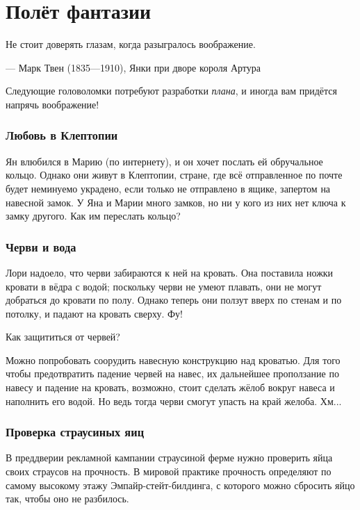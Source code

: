 \chapter{Полёт фантазии}


\setlength{\epigraphwidth}{.80\textwidth}
\epigraph{Не стоит доверять глазам, когда разыгралось воображение.
}{--- Марк Твен (1835---1910), Янки при дворе короля Артура}

Следующие головоломки потребуют разработки \emph{плана},
и иногда вам придётся напрячь воображение!

\subsection*{Любовь в Клептопии}\label{Любовь в Клептопии}

Ян влюбился в Марию (по интернету), и он хочет послать ей обручальное кольцо.
Однако они живут в Клептопии, стране, где всё отправленное по почте будет неминуемо украдено, если только не отправлено в ящике, запертом на навесной замок.
У Яна и Марии много замков, но ни у кого из них нет ключа к замку другого.
Как им переслать кольцо?

\subsection*{Черви и вода}\label{Черви и вода}

Лори надоело, что черви забираются к ней на кровать.
Она поставила ножки кровати в вёдра с водой;
поскольку черви не умеют плавать, они не могут добраться до кровати по полу.
Однако теперь они ползут вверх по стенам и по потолку, и падают на кровать сверху.
Фу!

Как защититься от червей?

Можно попробовать соорудить навесную конструкцию над кроватью.
Для того чтобы предотвратить падение червей на навес,
их дальнейшее проползание по навесу
и падение на кровать, возможно, стоит сделать жёлоб вокруг навеса и наполнить его водой.
Но ведь тогда черви смогут упасть на край желоба.
Хм...

\subsection*{Проверка страусиных яиц}

В преддверии рекламной кампании страусиной ферме нужно проверить яйца своих страусов на прочность.
В мировой практике прочность определяют по самому высокому этажу Эмпайр-стейт-билдинга, с которого можно сбросить яйцо так, чтобы оно не разбилось.

